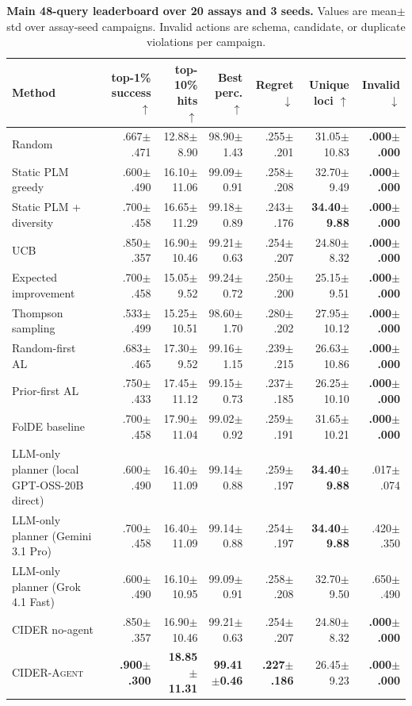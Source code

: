 \documentclass{article}
\newcommand{\method}{\textsc{CIDER}}
\newcommand{\agent}{\textsc{CIDER-Agent}}
\newcommand{\topone}{top-1\%}
\newcommand{\topten}{top-10\%}
\begin{document}
\begin{table}[t]
\caption{\textbf{Main 48-query leaderboard over 20 assays and 3 seeds.} Values are mean$\pm$std over assay-seed campaigns. Invalid actions are schema, candidate, or duplicate violations per campaign.}
\label{tab:leaderboard}
\centering
\scriptsize
\setlength{\tabcolsep}{3.2pt}
\begin{tabular}{lrrrrrr}
\toprule
Method & \topone{} success $\uparrow$ & \topten{} hits $\uparrow$ & Best perc. $\uparrow$ & Regret $\downarrow$ & Unique loci $\uparrow$ & Invalid $\downarrow$ \\
\midrule
Random & .667$\pm$.471 & 12.88$\pm$8.90 & 98.90$\pm$1.43 & .255$\pm$.201 & 31.05$\pm$10.83 & \textbf{.000$\pm$.000} \\
Static PLM greedy & .600$\pm$.490 & 16.10$\pm$11.06 & 99.09$\pm$0.91 & .258$\pm$.208 & \cellcolor{gray!20}32.70$\pm$9.49 & \textbf{.000$\pm$.000} \\
Static PLM + diversity & .700$\pm$.458 & 16.65$\pm$11.29 & 99.18$\pm$0.89 & .243$\pm$.176 & \textbf{34.40$\pm$9.88} & \textbf{.000$\pm$.000} \\
UCB & \cellcolor{gray!20}.850$\pm$.357 & 16.90$\pm$10.46 & 99.21$\pm$0.63 & .254$\pm$.207 & 24.80$\pm$8.32 & \textbf{.000$\pm$.000} \\
Expected improvement & .700$\pm$.458 & 15.05$\pm$9.52 & \cellcolor{gray!20}99.24$\pm$0.72 & .250$\pm$.200 & 25.15$\pm$9.51 & \textbf{.000$\pm$.000} \\
Thompson sampling & .533$\pm$.499 & 15.25$\pm$10.51 & 98.60$\pm$1.70 & .280$\pm$.202 & 27.95$\pm$10.12 & \textbf{.000$\pm$.000} \\
Random-first AL & .683$\pm$.465 & 17.30$\pm$9.52 & 99.16$\pm$1.15 & .239$\pm$.215 & 26.63$\pm$10.86 & \textbf{.000$\pm$.000} \\
Prior-first AL & .750$\pm$.433 & 17.45$\pm$11.12 & 99.15$\pm$0.73 & \cellcolor{gray!20}.237$\pm$.185 & 26.25$\pm$10.10 & \textbf{.000$\pm$.000} \\
FolDE baseline & .700$\pm$.458 & \cellcolor{gray!20}17.90$\pm$11.04 & 99.02$\pm$0.92 & .259$\pm$.191 & 31.65$\pm$10.21 & \textbf{.000$\pm$.000} \\
LLM-only planner (local GPT-OSS-20B direct) & .600$\pm$.490 & 16.40$\pm$11.09 & 99.14$\pm$0.88 & .259$\pm$.197 & \textbf{34.40$\pm$9.88} & \cellcolor{gray!20}.017$\pm$.074 \\
LLM-only planner (Gemini 3.1 Pro) & .700$\pm$.458 & 16.40$\pm$11.09 & 99.14$\pm$0.88 & .254$\pm$.197 & \textbf{34.40$\pm$9.88} & .420$\pm$.350 \\
LLM-only planner (Grok 4.1 Fast) & .600$\pm$.490 & 16.10$\pm$10.95 & 99.09$\pm$0.91 & .258$\pm$.208 & 32.70$\pm$9.50 & .650$\pm$.490 \\
\method{} no-agent & \cellcolor{gray!20}.850$\pm$.357 & 16.90$\pm$10.46 & 99.21$\pm$0.63 & .254$\pm$.207 & 24.80$\pm$8.32 & \textbf{.000$\pm$.000} \\
\agent{} & \textbf{.900$\pm$.300} & \textbf{18.85$\pm$11.31} & \textbf{99.41$\pm$0.46} & \textbf{.227$\pm$.186} & 26.45$\pm$9.23 & \textbf{.000$\pm$.000} \\
\bottomrule
\end{tabular}
\end{table}
\end{document}
